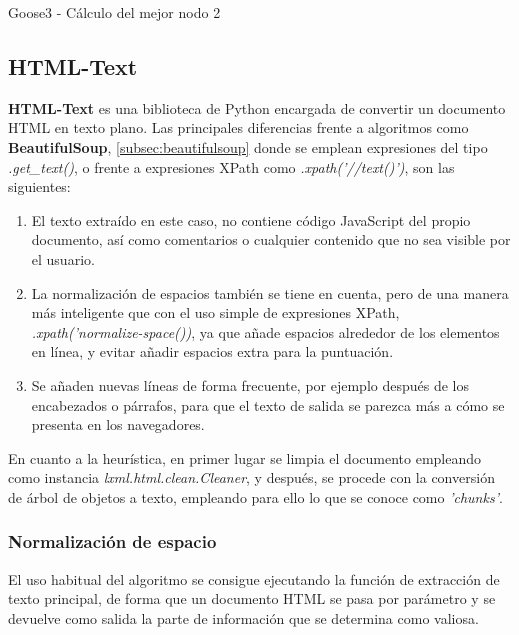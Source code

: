 \begin{codefloat}
  
  \caption{Goose3 - Cálculo del mejor nodo 2}
  \label{cod:goose3 - calculo del mejor nodo 2}
\end{codefloat}

\subsection{HTML-Text}
\label{subsec:html-text}

\textbf{HTML-Text} \cite{html-text} es una biblioteca de Python encargada de convertir un documento HTML
en texto plano. Las principales diferencias frente a algoritmos como \textbf{BeautifulSoup},
\ref{subsec:beautifulsoup} donde se emplean expresiones del tipo \emph{.get\_text()}, o frente a expresiones
XPath como \emph{.xpath('//text()')}, son las siguientes:

\begin{enumerate}
  \item El texto extraído en este caso, no contiene código JavaScript del propio documento, así como 
  comentarios o cualquier contenido que no sea visible por el usuario.
  \item La normalización de espacios también se tiene en cuenta, pero de una manera más inteligente que
  con el uso simple de expresiones XPath, \emph{.xpath('normalize-space())}, ya que añade espacios alrededor
  de los elementos en línea, y evitar añadir espacios extra para la puntuación.
  \item Se añaden nuevas líneas de forma frecuente, por ejemplo después de los encabezados o párrafos, para 
  que el texto de salida se parezca más a cómo se presenta en los navegadores.
\end{enumerate}

En cuanto a la heurística, en primer lugar se limpia el documento empleando como instancia
\emph{lxml.html.clean.Cleaner}, y después, se procede con la conversión de árbol de objetos a texto,
empleando para ello lo que se conoce como \emph{'chunks'}.

\subsubsection{Normalización de espacio}
\label{subsubsec:normalizacion de espacio}

El uso habitual del algoritmo se consigue ejecutando la función de extracción de texto principal, de forma 
que un documento HTML se pasa por parámetro y se devuelve como salida la parte de información que se determina
como valiosa.

